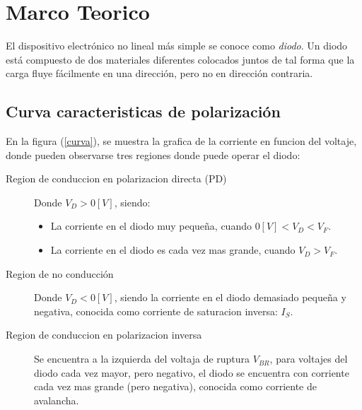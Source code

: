 \documentclass[letter,twoside,11pt]{article}
\begin{document}
\section{Marco Teorico}
El dispositivo electrónico no lineal más simple se conoce como \emph{diodo}. Un
diodo está compuesto de dos materiales diferentes colocados juntos de tal forma
que la carga fluye fácilmente en una dirección, pero no en dirección contraria.
\cite{Savant}

\subsection{Curva caracteristicas de polarización}
En la figura (\ref{curva}), se muestra la grafica de la corriente en funcion del
voltaje, donde pueden observarse tres regiones donde puede operar el diodo:
\cite{Tankara}

\begin{description}
    \item [Region de conduccion en polarizacion directa (PD)]
        Donde $V_D > 0[V]$, siendo:
        \begin{itemize}
            \item La corriente en el diodo muy pequeña, cuando $0[V] < V_D < V_F$.
            \item La corriente en el diodo es cada vez mas grande, cuando $V_D > V_F$.
        \end{itemize}
    \item [Region de no conducción]
        Donde $V_D < 0[V]$, siendo la corriente en el diodo demasiado pequeña y
        negativa, conocida como corriente de saturacion inversa: $I_S$.
    \item [Region de conduccion en polarizacion inversa]
        Se encuentra a la izquierda del voltaja de ruptura $V_{BR}$, para
        voltajes del diodo cada vez mayor, pero negativo, el diodo se encuentra
        con corriente cada vez mas grande (pero negativa), conocida como
        corriente de avalancha.
\end{description}
\end{document}
